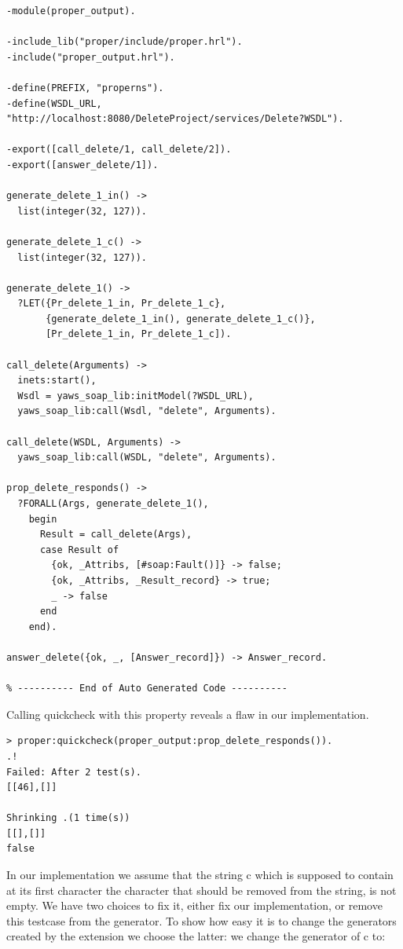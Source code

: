 \documentclass[submission,copyright,a4]{eptcs}
\begin{document}
\begin{lstlisting}
-module(proper_output).

-include_lib("proper/include/proper.hrl").
-include("proper_output.hrl").

-define(PREFIX, "properns").
-define(WSDL_URL, "http://localhost:8080/DeleteProject/services/Delete?WSDL").

-export([call_delete/1, call_delete/2]).
-export([answer_delete/1]).

generate_delete_1_in() -> 
  list(integer(32, 127)).

generate_delete_1_c() -> 
  list(integer(32, 127)).

generate_delete_1() -> 
  ?LET({Pr_delete_1_in, Pr_delete_1_c},
       {generate_delete_1_in(), generate_delete_1_c()},
       [Pr_delete_1_in, Pr_delete_1_c]).

call_delete(Arguments) ->
  inets:start(),
  Wsdl = yaws_soap_lib:initModel(?WSDL_URL),
  yaws_soap_lib:call(Wsdl, "delete", Arguments).
    
call_delete(WSDL, Arguments) ->
  yaws_soap_lib:call(WSDL, "delete", Arguments).

prop_delete_responds() ->
  ?FORALL(Args, generate_delete_1(),
    begin
      Result = call_delete(Args),
      case Result of 
        {ok, _Attribs, [#soap:Fault()]} -> false; 
        {ok, _Attribs, _Result_record} -> true;
        _ -> false
      end
    end).

answer_delete({ok, _, [Answer_record]}) -> Answer_record.

% ---------- End of Auto Generated Code ---------- 
\end{lstlisting}

Calling quickcheck with this property reveals a flaw in our implementation.

\begin{lstlisting}
> proper:quickcheck(proper_output:prop_delete_responds()). 
.!
Failed: After 2 test(s).
[[46],[]]

Shrinking .(1 time(s))
[[],[]]
false
\end{lstlisting}

In our implementation we assume that the string c which is supposed to contain 
at its first character the character that should be removed from the string, 
is not empty. We have two choices to fix it, either fix our implementation, or 
remove this testcase from the generator. To show how easy it is to change the 
generators created by the extension we choose the latter: we change the 
generator of c to:
\end{document}
